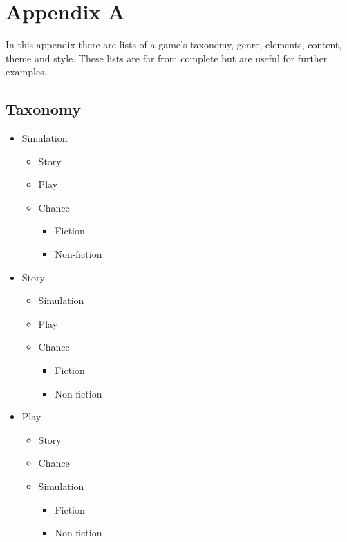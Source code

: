 \section{Appendix A}

In this appendix there are lists of a game’s taxonomy, genre, elements, content, theme and style. These lists are far from complete but are useful for further examples.

\subsection{Taxonomy}

\begin{itemize}[label=\textbullet]
  \item Simulation
  \begin{itemize}[label=$\circ$]
    \item Story
    \item Play
    \item Chance
    \begin{itemize}[label=\sqbullet]
      \item Fiction
      \item Non-fiction
    \end{itemize}
  \end{itemize}
  \item Story
  \begin{itemize}[label=$\circ$]
    \item Simulation
    \item Play
    \item Chance
    \begin{itemize}[label=\sqbullet]
      \item Fiction
      \item Non-fiction
    \end{itemize}
  \end{itemize}
  \item Play
  \begin{itemize}[label=$\circ$]
    \item Story
    \item Chance
    \item Simulation
    \begin{itemize}[label=\sqbullet]
      \item Fiction
      \item Non-fiction
    \end{itemize}
  \end{itemize}
\end{itemize}

